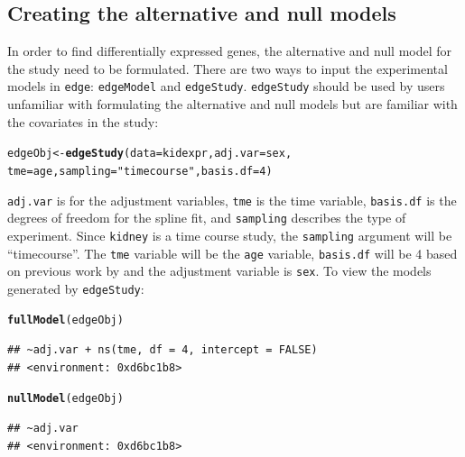 \documentclass{article}\usepackage[]{graphicx}\usepackage[]{color}
\makeatletter
\newcommand{\hlnum}[1]{\textcolor[rgb]{0.686,0.059,0.569}{#1}}%
\newcommand{\hlstr}[1]{\textcolor[rgb]{0.192,0.494,0.8}{#1}}%
\newcommand{\hlstd}[1]{\textcolor[rgb]{0.345,0.345,0.345}{#1}}%
\newcommand{\hlkwb}[1]{\textcolor[rgb]{0.69,0.353,0.396}{#1}}%
\newcommand{\hlkwc}[1]{\textcolor[rgb]{0.333,0.667,0.333}{#1}}%
\newcommand{\hlkwd}[1]{\textcolor[rgb]{0.737,0.353,0.396}{\textbf{#1}}}%
\newenvironment{kframe}{%
 \def\at@end@of@kframe{}%
 \ifinner\ifhmode%
  \def\at@end@of@kframe{\end{minipage}}%
  \begin{minipage}{\columnwidth}%
 \fi\fi%
 \def\FrameCommand##1{\hskip\@totalleftmargin \hskip-\fboxsep
 \colorbox{shadecolor}{##1}\hskip-\fboxsep
     \hskip-\linewidth \hskip-\@totalleftmargin \hskip\columnwidth}%
 \MakeFramed {\advance\hsize-\width
   \@totalleftmargin\z@ \linewidth\hsize
   \@setminipage}}%
 {\par\unskip\endMakeFramed%
 \at@end@of@kframe}
\newenvironment{knitrout}{}{} %
\makeatother
\begin{document}
\subsection{Creating the alternative and null models}
In order to find differentially expressed genes, the alternative and null model for the study need to be formulated. There are two ways to input the experimental models in {\tt edge}: {\tt edgeModel} and {\tt edgeStudy}. {\tt edgeStudy} should be used by users unfamiliar with formulating the alternative and null models but are familiar with the covariates in the study: 
\begin{knitrout}
\color{fgcolor}\begin{kframe}
\begin{alltt}
\hlstd{edgeObj} \hlkwb{<-} \hlkwd{edgeStudy}\hlstd{(}\hlkwc{data} \hlstd{= kidexpr,} \hlkwc{adj.var} \hlstd{= sex,}
    \hlkwc{tme} \hlstd{= age,} \hlkwc{sampling} \hlstd{=} \hlstr{"timecourse"}\hlstd{,} \hlkwc{basis.df} \hlstd{=} \hlnum{4}\hlstd{)}
\end{alltt}
\end{kframe}
\end{knitrout}

{\tt adj.var} is for the adjustment variables, {\tt tme} is the time variable, {\tt basis.df} is the degrees of freedom for the spline fit, and {\tt sampling} describes the type of experiment. Since {\tt kidney} is a time course study, the {\tt sampling} argument will be ``timecourse''. The {\tt tme} variable will be the {\tt age} variable, {\tt basis.df} will be 4 based on previous work by \cite{storey:2005} and the adjustment variable is {\tt sex}. To view the models generated by {\tt edgeStudy}:

\begin{knitrout}
\color{fgcolor}\begin{kframe}
\begin{alltt}
\hlkwd{fullModel}\hlstd{(edgeObj)}
\end{alltt}
\begin{verbatim}
## ~adj.var + ns(tme, df = 4, intercept = FALSE)
## <environment: 0xd6bc1b8>
\end{verbatim}
\begin{alltt}
\hlkwd{nullModel}\hlstd{(edgeObj)}
\end{alltt}
\begin{verbatim}
## ~adj.var
## <environment: 0xd6bc1b8>
\end{verbatim}
\end{kframe}
\end{knitrout}
\end{document}
